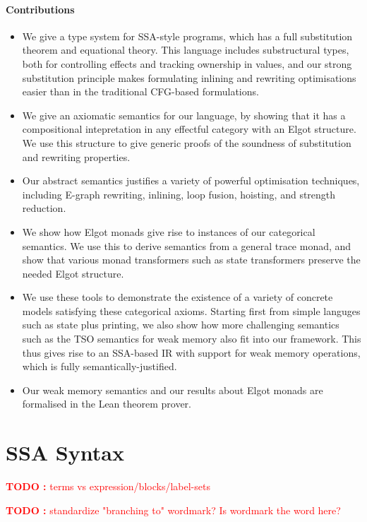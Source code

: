 \documentclass[acmsmall,screen,review]{acmart}
\newcounter{todos}
\newcommand{\TODO}[1]{{
  \stepcounter{todos}
  \begin{center}\large{\textcolor{red}{\textbf{TODO \arabic{todos}:} #1}}\end{center}
}}
\begin{document}
\paragraph{Contributions} 

\begin{itemize}
\item We give a type system for SSA-style programs, which has a full
substitution theorem and equational theory. This language includes substructural
types, both for controlling effects and tracking ownership in values, and our
strong substitution principle makes formulating inlining and rewriting
optimisations easier than in the traditional CFG-based formulations. 
\item We give an axiomatic semantics for our language, by showing that it has a
compositional intepretation in any effectful category with an Elgot structure.
We use this structure to give generic proofs of the soundness of substitution
and rewriting properties.
\item Our abstract semantics justifies a variety of powerful optimisation
techniques, including E-graph rewriting, inlining, loop fusion, hoisting, and
strength reduction. 
\item We show how Elgot monads give rise to instances of our categorical
semantics. We use this to derive semantics from a general trace monad, and show
that various monad transformers such as state transformers preserve the needed
Elgot structure. 
\item We use these tools to demonstrate the existence of a variety of concrete
models satisfying these categorical axioms. Starting first from simple languges
such as state plus printing, we also show how more challenging semantics such as
the TSO semantics for weak memory also fit into our framework. This thus gives
rise to an SSA-based IR with support for weak memory operations, which is fully
semantically-justified.
\item Our weak memory semantics and our results about Elgot monads are
formalised in the Lean theorem prover.
\end{itemize}

\section{SSA Syntax}

\TODO{terms vs expression/blocks/label-sets}

\TODO{standardize "branching to" wordmark? Is wordmark the word here?}
\end{document}
